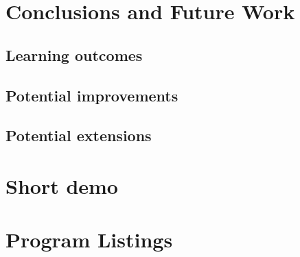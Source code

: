 \documentclass{report}
\begin{document}
\chapter{Conclusions and Future Work}
\section{Learning outcomes}
\section{Potential improvements}
\section{Potential extensions}


\begin{thebibliography}{9}
\end{thebibliography}


\appendix
\chapter{Short demo}
\chapter{Program Listings}

\end{document}
